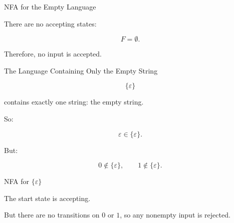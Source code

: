 \documentclass[10pt,aspectratio=169]{beamer}
\newcommand{\eps}{\varepsilon}
\begin{document}
\begin{frame}{NFA for the Empty Language}

\begin{center}
\end{center}

\vspace{1em}

There are no accepting states:

\[
F=\emptyset.
\]

Therefore, no input is accepted.

\end{frame}

\begin{frame}{The Language Containing Only the Empty String}

\[
\{\eps\}
\]

contains exactly one string: the empty string.

\vspace{1em}

So:

\[
\eps\in\{\eps\}.
\]

But:

\[
0\notin\{\eps\},\qquad 1\notin\{\eps\}.
\]

\end{frame}

\begin{frame}{NFA for \(\{\eps\}\)}

\begin{center}
\end{center}

\vspace{1em}

The start state is accepting.

\vspace{0.5em}

But there are no transitions on \(0\) or \(1\), so any nonempty input is rejected.

\end{frame}
\end{document}
